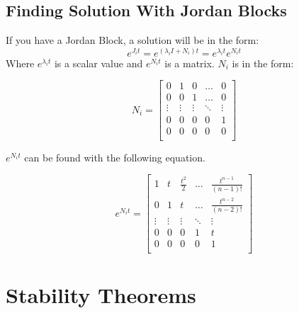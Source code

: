 \documentclass[12pt]{article}
\begin{document}
\subsection*{Finding Solution With Jordan Blocks}
If you have a Jordan Block, a solution will be in the form:
$$e^{J_it}=e^{(\lambda_iI+N_i)t}=e^{\lambda_it}e^{N_it}$$
Where $e^{\lambda_it}$ is a scalar value and $e^{N_it}$ is a matrix. $N_i$ is in the form:

$$
N_i=\begin{bmatrix} 
0 & 1 & 0 & \dots & 0 \\
0 & 0 & 1 & \dots & 0 \\
\vdots & \vdots & \vdots & \ddots & \vdots \\
0 & 0 & 0 & 0 & 1 \\
0 & 0 & 0 & 0 & 0\\
\end{bmatrix}
$$

$e^{N_it}$ can be found with the following equation.

$$e^{N_it}=\begin{bmatrix} 1 & t & \frac{t^2}{2} & \dots & \frac{t^{n-1}}{(n-1)!} \\
0 & 1 & t & \dots & \frac{t^{n-2}}{(n-2)!} \\
\vdots & \vdots & \vdots & \ddots & \vdots \\
0 & 0 & 0 & 1 & t \\
0 & 0 & 0 & 0 & 1\\
\end{bmatrix}$$ 

\newpage
\section*{Stability Theorems}
\end{document}

